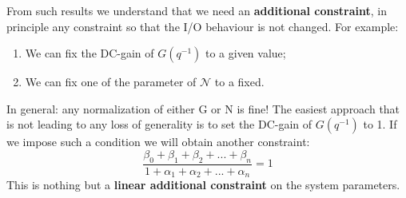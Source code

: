 From such results we understand that we need an \textbf{additional constraint}, in principle any constraint so that the I/O behaviour is not changed. For example: 
\begin{enumerate}
    \itemsep-0.2em
    \item We can fix the DC-gain of $G(q^{-1})$ to a given value;
    \item We can fix one of the parameter of $\mathcal{N}$ to a fixed.
\end{enumerate}
In general: any normalization of either G or N is fine! The easiest approach that is not leading to any loss of generality is to set the DC-gain of $G(q^{-1})$ to 1. If we impose such a condition we will obtain another constraint:
\begin{equation}
    \frac{\beta_0+\beta_1+\beta_2+...+\beta_n}{1+\alpha_1+\alpha_2+...+\alpha_n}=1
\end{equation}
This is nothing but a \textbf{linear additional constraint} on the system parameters. 

